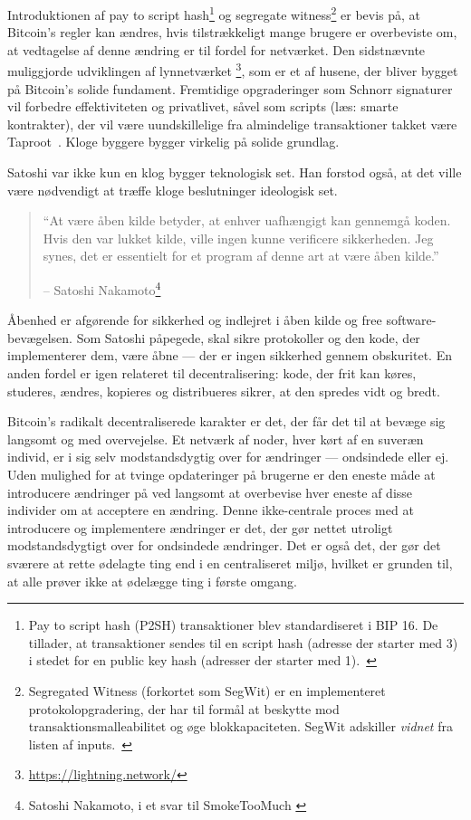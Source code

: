 Introduktionen af pay to script hash\footnote{ Pay to script hash (P2SH)
transaktioner blev standardiseret i BIP 16. De tillader, at transaktioner 
sendes til en script hash (adresse der starter med 3) i stedet for en public 
key hash (adresser der starter med 1).~\cite{btcwiki:p2sh}} og segregate
witness\footnote{Segregated Witness (forkortet som SegWit) er en implementeret
protokolopgradering, der har til formål at beskytte mod 
transaktionsmalleabilitet og øge blokkapaciteten. SegWit adskiller 
\textit{vidnet} fra listen af inputs.~\cite{btcwiki:segwit}} er bevis på,
at Bitcoin's regler kan ændres, hvis tilstrækkeligt mange brugere er 
overbeviste om, at vedtagelse af denne ændring er til fordel for netværket. 
Den sidstnævnte muliggjorde udviklingen af lynnetværket 
\footnote{\url{https://lightning.network/}}, som er et af husene, der bliver 
bygget på Bitcoin's solide fundament. Fremtidige opgraderinger som Schnorr
signaturer~\cite{bip:schnorr} vil forbedre effektiviteten og privatlivet, 
såvel som scripts (læs: smarte kontrakter), der vil være uundskillelige fra 
almindelige transaktioner takket være Taproot~\cite{taproot}. Kloge byggere 
bygger virkelig på solide grundlag.

Satoshi var ikke kun en klog bygger teknologisk set. Han forstod også, at det 
ville være nødvendigt at træffe kloge beslutninger ideologisk set.

\begin{quotation}\begin{samepage}
    \enquote{At være åben kilde betyder, at enhver uafhængigt kan gennemgå 
    koden. Hvis den var lukket kilde, ville ingen kunne verificere 
    sikkerheden. Jeg synes, det er essentielt for et program af denne art at 
    være åben kilde.}
    \begin{flushright} -- Satoshi Nakamoto\footnote{Satoshi Nakamoto, i et 
        svar til SmokeTooMuch \cite{satoshi-open-source}}
\end{flushright}\end{samepage}\end{quotation}

Åbenhed er afgørende for sikkerhed og indlejret i åben kilde og
free software-bevægelsen. Som Satoshi påpegede, skal sikre protokoller og
den kode, der implementerer dem, være åbne --- der er ingen sikkerhed
gennem obskuritet. En anden fordel er igen relateret til decentralisering:
kode, der frit kan køres, studeres, ændres, kopieres og distribueres
sikrer, at den spredes vidt og bredt.

Bitcoin's radikalt decentraliserede karakter er det, der får det til at 
bevæge sig langsomt og med overvejelse. Et netværk af noder, hver kørt af 
en suveræn individ, er i sig selv modstandsdygtig over for ændringer --- 
ondsindede eller ej. Uden mulighed for at tvinge opdateringer på brugerne er 
den eneste måde at introducere ændringer på ved langsomt at overbevise hver 
eneste af disse individer om at acceptere en ændring. Denne ikke-centrale 
proces med at introducere og implementere ændringer er det, der gør nettet 
utroligt modstandsdygtigt over for ondsindede ændringer. Det er også det, 
der gør det sværere at rette ødelagte ting end i en centraliseret miljø, 
hvilket er grunden til, at alle prøver ikke at ødelægge ting i første omgang.

